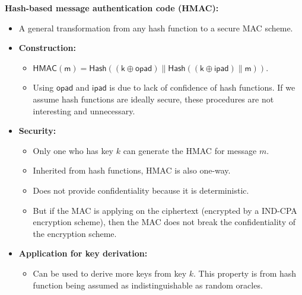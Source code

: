 \documentclass{article}
\newcommand{\msf}[1]{\mathsf{#1}}
\newcommand{\parhead}[1]{\noindent \textbf{#1}}
\begin{document}
\parhead{Hash-based message authentication code (HMAC):}
\begin{itemize}
    \item A general transformation from any hash function to a secure MAC scheme.
    
    \item {\bf Construction:}
    \begin{itemize}
        \item $\msf{HMAC}(\msf{m})=\msf{Hash}((\msf{k}\oplus\msf{opad})\parallel\msf{Hash}((\msf{k}\oplus\msf{ipad})\parallel\msf{m}))$.
        
        \item Using $\msf{opad}$ and $\msf{ipad}$ is due to lack of confidence of hash functions. If we assume hash functions are ideally secure, these procedures are not interesting and unnecessary.
    \end{itemize}
    
    \item {\bf Security:}
    \begin{itemize}
        \item Only one who has key $k$ can generate the HMAC for message $m$.
        
        \item Inherited from hash functions, HMAC is also one-way.
        
        \item Does not provide confidentiality because it is deterministic. 
        
        \item But if the MAC is applying on the ciphertext (encrypted by a IND-CPA encryption scheme), then the MAC does not break the confidentiality of the encryption scheme. 
    \end{itemize}
    
    \item {\bf Application for key derivation:}
    \begin{itemize}
        \item Can be used to derive more keys from key $k$. This property is from hash function being assumed as indistinguishable as random oracles.  
    \end{itemize}
\end{itemize}
\end{document}
